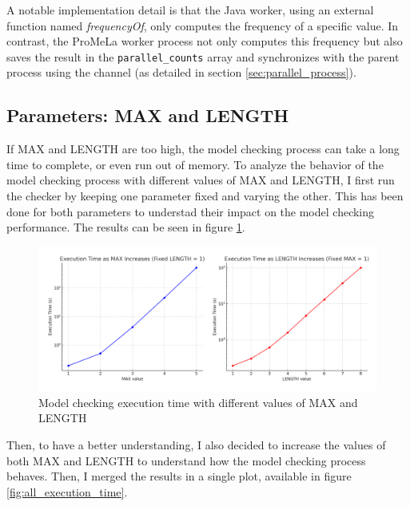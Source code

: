 \documentclass[a4paper, 11pt]{article}
\begin{document}
A notable implementation detail is that the Java worker, using an external function named \textit{frequencyOf}, only computes the frequency of a specific value. In contrast, the ProMeLa worker process not only computes this frequency but also saves the result in the \texttt{parallel\_counts} array and synchronizes with the parent process using the channel (as detailed in section \ref{sec:parallel_process}).

\subsection{Parameters: MAX and LENGTH}

If MAX and LENGTH are too high, the model checking process can take a long time to complete, or even run out of memory. To analyze the behavior of the model checking process with different values of MAX and LENGTH, I first run the checker by keeping one parameter fixed and varying the other. This has been done for both parameters to understad their impact on the model checking performance. The results can be seen in figure \ref{fig:execution_time}.

\begin{figure}[H]
	\centering
	\includegraphics[width=1\textwidth]{./images/max_length_exec_time.png}
	\caption{Model checking execution time with different values of MAX and LENGTH}
	\label{fig:execution_time}
\end{figure}

Then, to have a better understanding, I also decided to increase the values of both MAX and LENGTH to understand how the model checking process behaves. Then, I merged the results in a single plot, available in figure \ref{fig:all_execution_time}.
\end{document}
